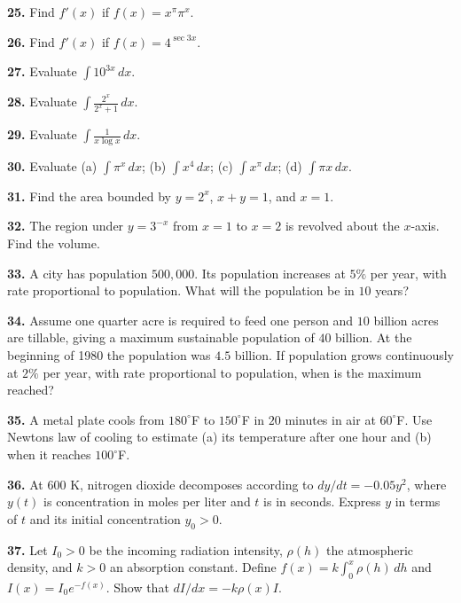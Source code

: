 \documentclass[11pt]{article}
\newcommand{\wsL}{\vspace*{6.5cm}}
\newcommand{\prob}[1]{\par\noindent\textbf{#1.}\quad}
\begin{document}
\wsL
\clearpage
\prob{25} Find $f'(x)$ if $f(x)=x^\pi\pi^x$.
\wsL
\vfill
\prob{26} Find $f'(x)$ if $f(x)=4^{\sec3x}$.
\wsL
\clearpage
\prob{27} Evaluate $\displaystyle\int10^{3x}\,dx$.
\wsL
\vfill
\prob{28} Evaluate $\displaystyle\int\frac{2^x}{2^x+1}\,dx$.
\wsL
\clearpage
\prob{29} Evaluate $\displaystyle\int\frac1{x\log x}\,dx$.
\wsL
\vfill
\prob{30} Evaluate (a) $\displaystyle\int\pi^x\,dx$; (b) $\displaystyle\int x^4\,dx$; (c) $\displaystyle\int x^\pi\,dx$; (d) $\displaystyle\int\pi x\,dx$.
\wsL
\clearpage
\prob{31} Find the area bounded by $y=2^x$, $x+y=1$, and $x=1$.
\wsL
\vfill
\prob{32} The region under $y=3^{-x}$ from $x=1$ to $x=2$ is revolved about the $x$-axis. Find the volume.
\wsL
\clearpage
\prob{33} A city has population $500{,}000$. Its population increases at $5\%$ per year, with rate proportional to population. What will the population be in $10$ years?
\wsL
\vfill
\prob{34} Assume one quarter acre is required to feed one person and $10$ billion acres are tillable, giving a maximum sustainable population of $40$ billion. At the beginning of 1980 the population was $4.5$ billion. If population grows continuously at $2\%$ per year, with rate proportional to population, when is the maximum reached?
\wsL
\clearpage
\prob{35} A metal plate cools from $180^\circ$F to $150^\circ$F in $20$ minutes in air at $60^\circ$F. Use Newton\textquotesingle s law of cooling to estimate (a) its temperature after one hour and (b) when it reaches $100^\circ$F.
\wsL
\vfill
\prob{36} At $600$ K, nitrogen dioxide decomposes according to $dy/dt=-0.05y^2$, where $y(t)$ is concentration in moles per liter and $t$ is in seconds. Express $y$ in terms of $t$ and its initial concentration $y_0>0$.
\wsL
\clearpage
\prob{37} Let $I_0>0$ be the incoming radiation intensity, $\rho(h)$ the atmospheric density, and $k>0$ an absorption constant. Define $f(x)=k\int_0^x\rho(h)\,dh$ and $I(x)=I_0e^{-f(x)}$. Show that $dI/dx=-k\rho(x)I$.
\wsL
\clearpage
\end{document}
